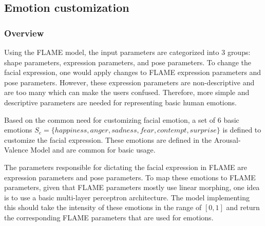 
\subsection{Emotion customization}

\subsubsection{Overview}

Using the FLAME model, the input parameters are categorized into 3 groups: shape parameters, expression parameters, and pose parameters. To change the facial expression, one would apply changes to FLAME expression parameters and pose parameters. However, these expression parameters are non-descriptive and are too many which can make the users confused. Therefore, more simple and descriptive parameters are needed for representing basic human emotions.

Based on the common need for customizing facial emotion, a set of 6 basic emotions $S_e=\{ happiness, anger, sadness, fear, contempt, surprise\}$ is defined to customize the facial expression. These emotions are defined in the Arousal-Valence Model and are common for basic usage.

The parameters responsible for dictating the facial expression in FLAME are expression parameters and pose parameters. To map these emotions to FLAME parameters, given that FLAME parameters mostly use linear morphing, one idea is to use a basic multi-layer perceptron architecture. The model implementing this should take the intensity of these emotions in the range of $[0,1]$ and return the corresponding FLAME parameters that are used for emotions.